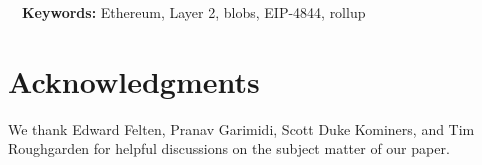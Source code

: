 \documentclass[11pt]{article}
\begin{document}
\hspace{3cm}
\begin{center}
    ~~\textbf{Keywords:} Ethereum, Layer 2, blobs, EIP-4844, rollup
\end{center}










\section*{Acknowledgments}
We thank Edward Felten, Pranav Garimidi, Scott Duke Kominers, and Tim Roughgarden for helpful discussions on the subject matter of our paper.



\newpage   
\printbibliography
\newpage    
\appendix

\end{document}
